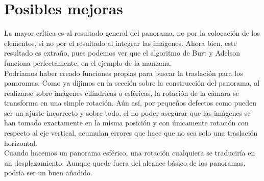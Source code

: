 \documentclass[10pt,a4paper]{article}
\theoremstyle{definition}
\begin{document}
\section{Posibles mejoras}

La mayor crítica es al resultado general del panorama, no por la colocación de los elementos, si no por el resultado al integrar las imágenes. Ahora bien, este resultado es extraño, pues podemos ver que el algoritmo de Burt y Adelson funciona perfectamente, en el ejemplo de la manzana.\\

Podríamos haber creado funciones propias para buscar la traslación para los panoramas. Como ya dijimos en la sección sobre la construcción del panorama, al realizarse sobre imágenes cilíndricas o esféricas, la rotación de la cámara se transforma en una simple rotación. Aún así, por pequeños defectos como pueden ser un ajuste incorrecto y sobre todo, el no poder asegurar que las imágenes se han tomado exactamente en la misma posición y con únicamente rotación con respecto al eje vertical, acumulan errores que hace que no sea solo una traslación horizontal.\\

Cuando hacemos un panorama esférico, una rotación cualquiera se traduciría en un desplazamiento. Aunque quede fuera del alcance básico de los panoramas, podría ser un buen añadido.\\
\end{document}
